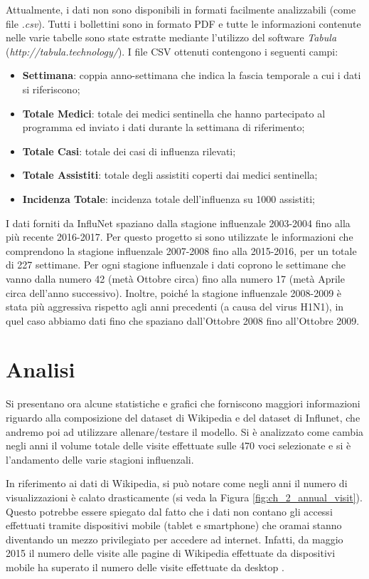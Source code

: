 Attualmente, i dati non sono disponibili in formati facilmente analizzabili (come file \textit{.csv}). Tutti i bollettini
sono in formato PDF e tutte le informazioni contenute nelle varie tabelle sono state estratte mediante l'utilizzo del software \textit{Tabula} (\textit{http://tabula.technology/}). I file CSV ottenuti contengono i seguenti campi:
\begin{itemize}[noitemsep]
\item \textbf{Settimana}: coppia anno-settimana che indica la fascia temporale a cui i dati si riferiscono;
\item \textbf{Totale Medici}: totale dei medici sentinella che hanno partecipato al programma ed inviato i dati durante la settimana di riferimento; 
\item \textbf{Totale Casi}: totale dei casi di influenza rilevati;
\item \textbf{Totale Assistiti}: totale degli assistiti coperti dai medici sentinella;
\item \textbf{Incidenza Totale}: incidenza totale dell'influenza su 1000 assistiti;
\end{itemize}
\bigskip

I dati forniti da InfluNet spaziano dalla stagione influenzale 2003-2004 fino alla più recente 2016-2017. Per questo progetto 
si sono utilizzate le informazioni che comprendono la stagione influenzale 2007-2008 fino alla 2015-2016, per un totale di 
227 settimane. Per ogni stagione influenzale i dati coprono le settimane che vanno dalla numero 42 (metà Ottobre circa) fino 
alla numero 17 (metà Aprile circa dell'anno successivo). Inoltre, poiché la stagione influenzale 2008-2009 è stata più 
aggressiva rispetto agli anni precedenti (a causa del virus H1N1), in quel caso abbiamo dati fino che spaziano dall'Ottobre 
2008 fino all'Ottobre 2009.

\section{Analisi}
\bigskip

Si presentano ora alcune statistiche e grafici che forniscono maggiori informazioni riguardo alla composizione del dataset di 
Wikipedia e del dataset di Influnet, che andremo poi ad utilizzare allenare/testare il modello. Si è analizzato come 
cambia negli anni il volume totale delle visite effettuate sulle 470 voci selezionate e si è 
l'andamento delle varie stagioni influenzali.
\bigskip

In riferimento ai dati di Wikipedia, si può notare come negli anni il numero di visualizzazioni è calato drasticamente (si 
veda la Figura \ref{fig:ch_2_annual_visit}). Questo potrebbe essere spiegato dal fatto che i dati non contano gli accessi 
effettuati tramite dispositivi mobile (tablet e smartphone) che oramai stanno diventando un mezzo privilegiato per accedere 
ad internet. Infatti, da maggio 2015 il numero delle visite alle pagine di Wikipedia effettuate da dispositivi mobile ha 
superato il numero delle visite effettuate da desktop \cite{wikipedia_mobile_desktop}.
\bigskip

